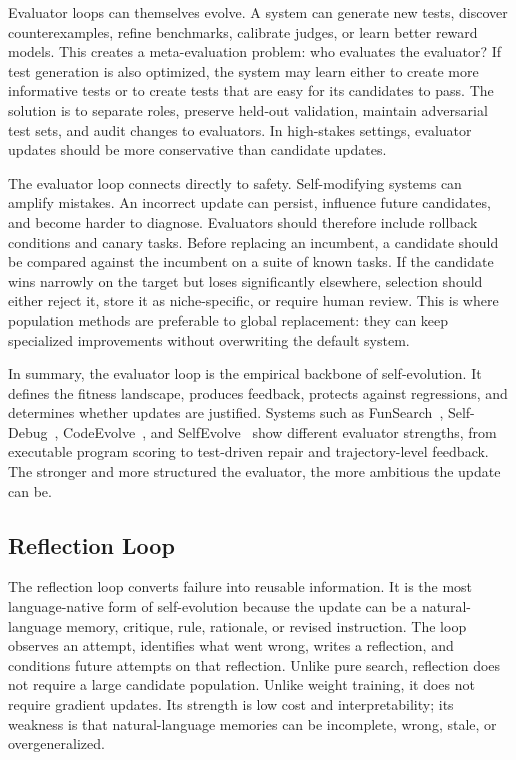 Evaluator loops can themselves evolve.  A system can generate new tests, discover counterexamples, refine benchmarks, calibrate judges, or learn better reward models.  This creates a meta-evaluation problem: who evaluates the evaluator?  If test generation is also optimized, the system may learn either to create more informative tests or to create tests that are easy for its candidates to pass.  The solution is to separate roles, preserve held-out validation, maintain adversarial test sets, and audit changes to evaluators.  In high-stakes settings, evaluator updates should be more conservative than candidate updates.

The evaluator loop connects directly to safety.  Self-modifying systems can amplify mistakes.  An incorrect update can persist, influence future candidates, and become harder to diagnose.  Evaluators should therefore include rollback conditions and canary tasks.  Before replacing an incumbent, a candidate should be compared against the incumbent on a suite of known tasks.  If the candidate wins narrowly on the target but loses significantly elsewhere, selection should either reject it, store it as niche-specific, or require human review.  This is where population methods are preferable to global replacement: they can keep specialized improvements without overwriting the default system.

In summary, the evaluator loop is the empirical backbone of self-evolution.  It defines the fitness landscape, produces feedback, protects against regressions, and determines whether updates are justified.  Systems such as FunSearch~\cite{funsearch2024}, Self-Debug~\cite{singh2023selfdebug}, CodeEvolve~\cite{codeevolve2024}, and SelfEvolve~\cite{selfevolve2023} show different evaluator strengths, from executable program scoring to test-driven repair and trajectory-level feedback.  The stronger and more structured the evaluator, the more ambitious the update can be.

\subsection{Reflection Loop}
\label{subsec:taxonomy-reflection}

The reflection loop converts failure into reusable information.  It is the most language-native form of self-evolution because the update can be a natural-language memory, critique, rule, rationale, or revised instruction.  The loop observes an attempt, identifies what went wrong, writes a reflection, and conditions future attempts on that reflection.  Unlike pure search, reflection does not require a large candidate population.  Unlike weight training, it does not require gradient updates.  Its strength is low cost and interpretability; its weakness is that natural-language memories can be incomplete, wrong, stale, or overgeneralized.

